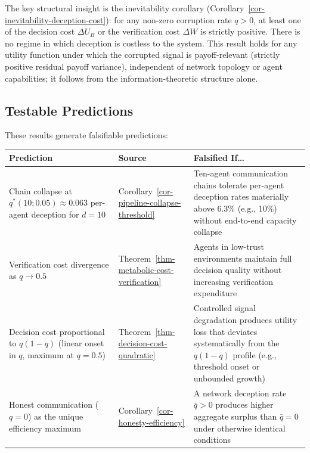 \documentclass[11pt]{article}
\theoremstyle{plain}
\theoremstyle{definition}
\theoremstyle{remark}
\newcounter{none}
\let\origsubsection\subsection
\renewcommand{\subsection}{\needspace{7\baselineskip}\origsubsection}
\begin{document}
The key structural insight is the inevitability corollary
(Corollary~\ref{cor-inevitability-deception-cost}): for any non-zero
corruption rate \(q > 0\), at least one of the decision cost
\(\Delta U_B\) or the verification cost \(\Delta W\) is strictly
positive. There is no regime in which deception is costless to the
system. This result holds for any utility function under which the
corrupted signal is payoff-relevant (strictly positive residual payoff
variance), independent of network topology or agent capabilities; it
follows from the information-theoretic structure alone.

\subsection{Testable Predictions}\label{testable-predictions}

These results generate falsifiable predictions:

{\def\LTcaptype{none} %
\begin{longtable}[]{@{}
  >{\raggedright\arraybackslash}p{}
  >{\raggedright\arraybackslash}p{}
  >{\raggedright\arraybackslash}p{}@{}}
\toprule\noalign{}
\begin{minipage}[b]{\linewidth}\raggedright
Prediction
\end{minipage} & \begin{minipage}[b]{\linewidth}\raggedright
Source
\end{minipage} & \begin{minipage}[b]{\linewidth}\raggedright
Falsified If\ldots{}
\end{minipage} \\
\midrule\noalign{}
\endhead
\bottomrule\noalign{}
\endlastfoot
Chain collapse at \(q^*(10; 0.05) \approx 0.063\) per-agent deception
for \(d = 10\) & Corollary~\ref{cor-pipeline-collapse-threshold} &
Ten-agent communication chains tolerate per-agent deception rates
materially above 6.3\% (e.g., 10\%) without end-to-end capacity
collapse \\
Verification cost divergence as \(q \to 0.5\) &
Theorem~\ref{thm-metabolic-cost-verification} & Agents in low-trust
environments maintain full decision quality without increasing
verification expenditure \\
Decision cost proportional to \(q(1-q)\) (linear onset in \(q\), maximum
at \(q = 0.5\)) & Theorem~\ref{thm-decision-cost-quadratic} & Controlled
signal degradation produces utility loss that deviates systematically
from the \(q(1-q)\) profile (e.g., threshold onset or unbounded
growth) \\
Honest communication (\(q = 0\)) as the unique efficiency maximum &
Corollary~\ref{cor-honesty-efficiency} & A network deception rate
\(\bar{q} > 0\) produces higher aggregate surplus than \(\bar{q} = 0\)
under otherwise identical conditions \\
\end{longtable}
}
\end{document}
